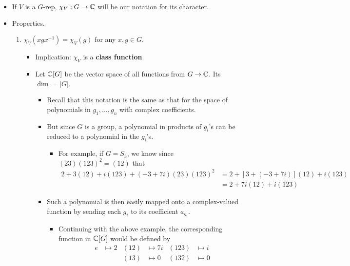 \documentclass[../notes.tex]{subfiles}
\begin{document}
\begin{itemize}
\begin{itemize}
\begin{itemize}
        \end{itemize}
    \end{itemize}
    \item If $V$ is a $G$-rep, $\chi_V:G\to\mathbb{C}$ will be our notation for its character.
    \item Properties.
    \begin{enumerate}
        \item $\chi_V(xgx^{-1})=\chi_V(g)$ for any $x,g\in G$.
        \begin{itemize}
            \item Implication: $\chi_V$ is a \textbf{class function}.
            \item Let $\mathbb{C}[G]$ be the vector space of all functions from $G\to\mathbb{C}$. Its $\dim=|G|$.
            \begin{itemize}
                \item Recall that this notation is the same as that for the space of polynomials in $g_1,\dots,g_n$ with complex coefficients.
                \item But since $G$ is a group, a polynomial in products of $g_i$'s can be reduced to a polynomial in the $g_i$'s.
                \begin{itemize}
                    \item For example, if $G=S_3$, we know since $(23)(123)^2=(12)$ that
                    \begin{align*}
                        2+3(12)+i(123)+(-3+7i)(23)(123)^2 &= 2+[3+(-3+7i)](12)+i(123)\\
                        &= 2+7i(12)+i(123)
                    \end{align*}
                \end{itemize}
                \item Such a polynomial is then easily mapped onto a complex-valued function by sending each $g_i$ to its coefficient $a_{g_i}$.
                \begin{itemize}
                    \item Continuing with the above example, the corresponding function in $\mathbb{C}[G]$ would be defined by
                    \begin{align*}
                        e &\mapsto 2&
                            (12) &\mapsto 7i&
                                (123) &\mapsto i\\
                        &&
                            (13) &\mapsto 0&
                                (132) &\mapsto 0\\

\end{align*}
\end{itemize}
\end{itemize}
\end{itemize}
\end{enumerate}
\end{itemize}
\end{document}
